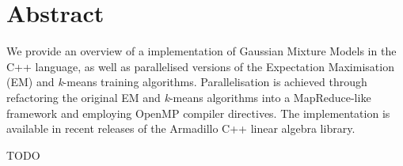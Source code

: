 \section*{Abstract}

We provide an overview of a implementation of Gaussian Mixture Models in the C++ language,
as well as parallelised versions of the Expectation Maximisation (EM) and {\it k}-means training algorithms.
Parallelisation is achieved through refactoring the original EM and {\it k}-means algorithms into a MapReduce-like framework
and employing OpenMP compiler directives.
The implementation is available in recent releases of the Armadillo C++ linear algebra library.

TODO


